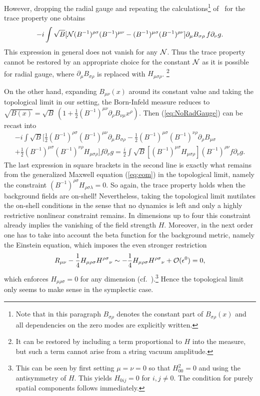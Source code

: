 \documentclass[a4paper,12pt]{article}
\newcommand {\cN}{{\cal N}}
\newcommand {\cO}{{\cal O}}
\begin{document}
However, dropping the radial gauge and repeating the 
calculations\footnote{Note that in this paragraph $B_{\sigma\rho}$ denotes 
the constant part of $B_{\sigma\rho}(x)$ and all dependencies on the zero 
modes are explicitly written.}  
of~\cite{Cornalba:2001sm} for the trace property one obtains
\begin{equation}
  \label{eq:NoRadGauge}
  -i\int \sqrt{B}[\cN (B^{-1})^{\rho\sigma}(B^{-1})^{\mu\nu} 
  -(B^{-1})^{\mu\sigma}(B^{-1})^{\rho\nu}]
   \partial_\mu B_{\sigma\rho}\,f\partial_\nu g.
\end{equation}
This expression in general does not vanish for any $\cN$. Thus the trace 
property cannot be restored by an appropriate choice for the constant $\cN$ 
as it is possible for radial gauge, where $\partial_\mu B_{\sigma\rho}$ 
is replaced with $H_{\mu\sigma\rho}$.%
\footnote{It can be restored by including a term proportional to $H$ into the
measure, but such a term cannot arise from a string vacuum amplitude.}

On the other hand, expanding $B_{\mu\nu}(x)$ around its 
constant value and taking the topological limit in our setting, 
the Born-Infeld measure reduces to 
$\sqrt{B(x)}=\sqrt{B}~(1+\frac 12(B^{-1})^{\mu\nu}\partial_\rho B_{\nu\mu}x^\rho)$. 
Then (\ref{eq:NoRadGauge}) can be recast into
\begin{eqnarray}
  \label{eq:correct}
  & -i\int\sqrt{B}
   [\frac 12 (B^{-1})^{\rho\sigma}(B^{-1})^{\mu\nu}\partial_\mu B_{\sigma\rho} 
   -\frac 12 (B^{-1})^{\mu\sigma}(B^{-1})^{\nu\rho}\partial_\rho B_{\mu\sigma}&
\nonumber\\ 
  &+\frac 12 (B^{-1})^{\mu\sigma}(B^{-1})^{\nu\rho}H_{\mu\sigma\rho}]
   f\partial_\nu g 
   =\frac{i}{2}\int\sqrt{B}
    [(B^{-1})^{\mu\sigma}H_{\mu\sigma\rho}](B^{-1})^{\rho\nu}f\partial_\nu g.&
\end{eqnarray}
The last expression in square brackets in the second line is exactly what 
remains from the generalized Maxwell equation (\ref{eq:eom}) in the 
topological limit, namely the constraint 
$(B^{-1})^{\rho\sigma}H_{\rho\sigma\lambda}=0$. 
So again, the trace property holds when the background fields are on-shell! 
Nevertheless, taking the topological limit mutilates the on-shell conditions 
in the sense that no dynamics is left and only a highly restrictive nonlinear 
constraint remains. In dimensions up to four this constraint already implies 
the vanishing of the field strength $H$. Moreover, in the next order one has 
to take into account the beta function for the background metric, namely the 
Einstein equation, which imposes the even stronger restriction
\begin{eqnarray}
  \label{eq:eomlimit}
  R_{\mu\nu} - \frac 14 
      H_{\mu\rho\sigma} H^{\rho\sigma}{}_\nu 
  \sim - \frac 14 
      H_{\mu\rho\sigma} H^{\rho\sigma}{}_\nu  + 
      \cO(\epsilon^0) = 0,
\end{eqnarray}
which enforces $H_{\mu\rho\sigma}=0$ for any dimension 
(cf.~\cite{Baulieu:2001fi}).\footnote{This can be seen by first setting 
$\mu = \nu = 0$ so that $H^2_{00} = 0$ and using the antisymmetry of $H$. 
This yields $H_{0ij}=0$ for $i,j \not= 0$. The condition for purely spatial
components follows immediately.} Hence the topological limit only seems to 
make sense in the symplectic case.
\end{document}
